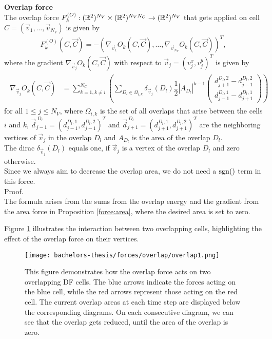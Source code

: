 \begin{proposition} \textbf{Overlap force} \\
	The overlap force $F_{k}^{(O)}: (\mathbb{R}^2)^{N_V} \times (\mathbb{R}^2)^{N_V N_C} \rightarrow (\mathbb{R}^2)^{N_V}$ that gets applied on cell $C = (\vec{v}_1, \ldots, \vec{v}_{N_V})$ is given by  
	\begin{align*}
		F_{k}^{(O)}(C, \vec{C}) 
		= - (\nabla_{\vec{v}_1} O_k(C, \vec{C}), \ldots, \nabla_{\vec{v}_{N_V}} O_k(C, \vec{C}))^T,
	\end{align*}
	where the gradient $\nabla_{\vec{v}_j} O_k(C, \vec{C})$ with respect to $\vec{v}_j = (v_{j}^{x}, v_{j}^{y})^T$ is given by 
	\begin{align}
		\begin{split}
			\nabla_{\vec{v}_j} O_k(C, \vec{C}) &= \sum\limits_{k=1, k \neq i}^{N_C} \left( \sum\limits_{D_l \in \Omega_{i,k}} \delta_{\vec{v}_j}(D_l)  \dfrac{1}{2} |A_{D_l}|^{k-1} \begin{pmatrix} d_{j+1}^{D_l, 2} - d_{j-1}^{D_l, 2} \\[0.5em]  d_{j-1}^{D_l, 1} - d_{j+1}^{D_l, 1} \end{pmatrix} \right)
		\end{split}
		\label{gradient:overlap}
	\end{align}
	for all $1 \leq j \leq N_V$, where $\Omega_{i,k}$ is the set of all overlaps that arise between the cells $i$ and $k$, $\vec{d}_{j-1}^{\: D_l} = (d_{j-1}^{D_l, 1}, d_{j-1}^{D_l, 2})^T$ and $\vec{d}_{j+1}^{\: D_l} = (d_{j+1}^{D_l, 1}, d_{j+1}^{D_l, 2})^T$ are the neighboring vertices of $\vec{v}_j$ in the overlap $D_l$ and $A_{D_l}$ is the area of the overlap $D_l$.\\
	The dirac $\delta_{\vec{v}_j}(D_l)$ equals one, if $\vec{v}_j$ is a vertex of the overlap $D_l$ and zero otherwise. \\
	Since we always aim to decrease the overlap area, we do not need a $\operatorname{sgn}()$ term in this force. \\

	Proof. \\
	The formula arises from the sums from the overlap energy and the gradient from the area force in Proposition \ref{force:area}, where the desired area is set to zero. 
\end{proposition}

Figure \ref{fig:overlapForce} illustrates the interaction between two overlapping cells, highlighting the effect of the overlap force on their vertices.
\begin{figure}[h!]
	\begin{center}
		\texttt{[image: bachelors-thesis/forces/overlap/overlap1.png]}
			\caption{This figure demonstrates how the overlap force acts on two overlapping DF cells.
			The blue arrows indicate the forces acting on the blue cell, while the red arrows represent those acting on the red cell.
			The current overlap areas at each time step are displayed below the corresponding diagrams.			
			On each consecutive diagram, we can see that the overlap gets reduced, until the area of the overlap is zero.  }
			\label{fig:overlapForce}
	\end{center}
\end{figure}


